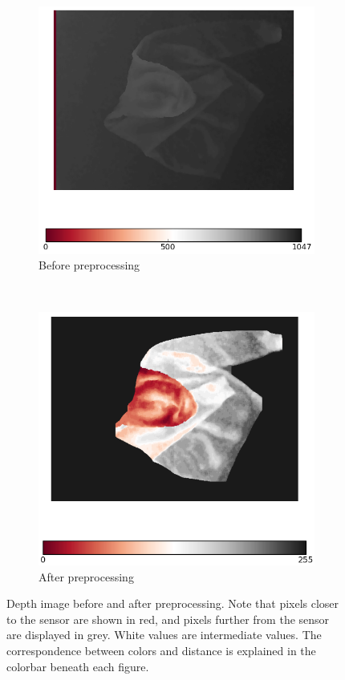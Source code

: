 \begin{figure}[htbp]
	\centering
    \begin{subfigure}[l]{0.495\textwidth}
	    \centering
    	\includegraphics[width=\textwidth]
    	{figures/Depthmap-Raw-Depthmap-with-colorbar.png}
    	\caption{Before preprocessing}
	\end{subfigure}
	~
    \begin{subfigure}[r]{0.485\textwidth}
	    \centering
    	\includegraphics[width=\textwidth]
    	{figures/Depthmap-Normalized-Depthmap-with-colorbar.png}
    	\caption{After preprocessing}
    	\end{subfigure} 
    \caption[Depth image before and after preprocessing.]
    {Depth image before and after preprocessing. Note that pixels closer to the sensor are shown in red, and pixels further from the sensor are displayed in grey. White values are intermediate values. The correspondence between colors and distance is explained in the colorbar beneath each figure.} 
    \label{fig:depth_map_preprocessing}
\end{figure}


